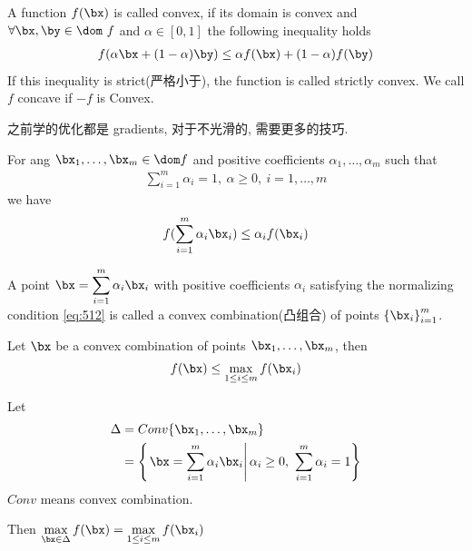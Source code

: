 \begin{definition}
    A function $f(\bx)$ is called convex, if its domain is convex and $\forall \bx,\by \in \dom\ f$ and $\alpha\in[0,1]$ the following inequality holds
    \begin{align*}
        f(\alpha \bx +(1-\alpha)\by)\le \alpha f(\bx)+(1-\alpha)f(\by)
    \end{align*}
    If this inequality is strict(严格小于), the function is called strictly convex. We call $f$ concave if $-f$ is Convex. 
\end{definition}
之前学的优化都是 gradients, 对于不光滑的, 需要更多的技巧. 


\begin{lemma}
    For ang $\bx_1,\dots,\bx_m\in \dom f$ and positive coefficients $\alpha_1, \dots, \alpha_m$ such that 
    \begin{align}
        \sum_{i=1}^m \alpha_i=1,\ \alpha\ge 0,\ i=1,\dots,m \label{eq:512}
    \end{align}
    we have
    \begin{align*}
        f(\sum_{i=1}^m \alpha_i \bx_i)\le \alpha_i f(\bx_i)
    \end{align*}
\end{lemma}

A point $\displaystyle \bx=\sum_{i=1}^m \alpha_i\bx_i$ with positive coefficients $\alpha_i$ satisfying the normalizing condition \ref{eq:512} is called a convex combination(凸组合) of points $\left\{ \bx_i \right\}_{i=1}^m$. 
    

\begin{corollary}
    Let $\bx$ be a convex combination of points $\bx_1, \dots, \bx_m$, then
    \begin{align*}
        f(\bx)\le \max_{1\le i\le m}f(\bx_i)
    \end{align*}
\end{corollary}

\begin{corollary}
    Let
    \begin{align*}
        \Delta &= Conv\{ \bx_1,\dots,\bx_m \}\\
        &=\left\{ \left. \bx=\sum_{i=1}^m\alpha_i\bx_i \right|\alpha_i\ge 0,\ \sum_{i=1}^m \alpha_i=1\right\}
    \end{align*}
    $Conv$ means convex combination. 
    
    Then $\displaystyle \max_{\bx\in\Delta}f(\bx)=\max_{1\le i\le m}f(\bx_i)$
\end{corollary}


